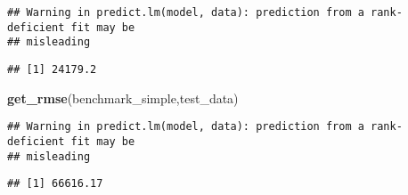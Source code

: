 \documentclass[]{article}
\newenvironment{Shaded}{\begin{snugshade}}{\end{snugshade}}
\newcommand{\KeywordTok}[1]{\textcolor[rgb]{0.13,0.29,0.53}{\textbf{#1}}}
\newcommand{\NormalTok}[1]{#1}
\begin{document}
\begin{verbatim}
## Warning in predict.lm(model, data): prediction from a rank-deficient fit may be
## misleading
\end{verbatim}

\begin{verbatim}
## [1] 24179.2
\end{verbatim}

\begin{Shaded}
\begin{Highlighting}[]
\KeywordTok{get_rmse}\NormalTok{(benchmark_simple,test_data)}
\end{Highlighting}
\end{Shaded}

\begin{verbatim}
## Warning in predict.lm(model, data): prediction from a rank-deficient fit may be
## misleading
\end{verbatim}

\begin{verbatim}
## [1] 66616.17
\end{verbatim}
\end{document}

